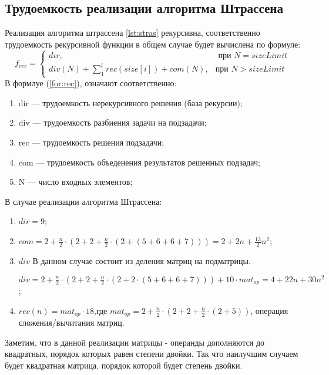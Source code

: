 \subsection{Трудоемкость реализации алгоритма Штрассена}
Реализация алгоритма штрассена \ref{lst:stras} рекурсивна, соответственно трудоемкость рекурсивной функции в общем случае будет вычислена по формуле:
\begin{equation}
	\label{for:rec}
	f_{rec} =
	\begin{cases}
		dir, & \text{ при $N = sizeLimit$}\\
		div(N) +\sum_{1}^{l}{rec(size[i])} + com(N), & \text{при $N> sizeLimit$}
	\end{cases}
\end{equation}
В формлуе (\ref{for:rec}), означают соответственно:
\begin{enumerate}
	\item dir --- трудоемкость нерекурсивного решения (база рекурсии);
	\item div --- трудоемкость разбиения задачи на подзадачи;
	\item rec --- трудоемкость решения подзадачи;
	\item com --- трудоемкость объеденения результатов решенных подзадач;
	\item N --- число входных элементов;
\end{enumerate}


В случае реализации алгоритма Штрассена:
\begin{enumerate}
	\item $dir  = 9$;
	\item $com =  2 + \frac{n}{2} \cdot (2 + 2 + \frac{n}{2} \cdot (2 +  (5 + 6 + 6 + 7))) = 2 +2n + \frac{13}{2}n^2$;
	\item $div$ В данном случае состоит из деления матриц на подматрицы.
	
	$div = 2 + \frac{n}{2} \cdot (2 + 2 + \frac{n}{2} \cdot (2 + 2 \cdot (5 + 6 + 6 + 7))) +10 \cdot mat_{op} = 4 + 22n + 30n^{2}$;

	\item $rec(n) = mat_{op} \cdot 18$,где $mat_{op} = 2 + \frac{n}{2} \cdot (2 + 2 + \frac{n}{2} \cdot (2 +5))$, операция сложения/вычитания матриц.
\end{enumerate}
Заметим, что в данной реализации матрицы - операнды дополняются до квадратных, порядок которых равен степени двойки. Так что наилучшим случаем будет квадратная матрица, порядок которой будет степень двойки.




